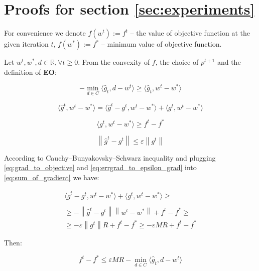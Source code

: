 \documentclass[runningheads, final]{llncs}
\newcommand{\norm}[1]{\left\lVert#1\right\rVert}
\newcommand{\vprod}[1]{\langle#1\rangle}
\newcommand{\errgrad}{\hat{g}}
\begin{document}
\clearpage
\section{Proofs for section \ref{sec:experiments}}

For convenience we denote $f(w^t) := f^t$ -- the value of objective
function at the given iteration $t$, $f(w^*) := f^*$ -- minimum value of
objective function.

Let $w^t, w^*, d \in \mathbb{R}, \forall t \geqslant 0$. From the convexity
of $f$, the choice of $p^{t+1}$ and the definition of \textbf{EO}:

\begin{equation}
    -\min_{d \in C}\vprod{\errgrad_t, d - w^t} \geqslant
    \vprod{\errgrad_t, w^t - w^*}
\end{equation}

\begin{equation}\label{eq:sum_of_gradient}
    \vprod{\errgrad^t, w^t - w^*} = \vprod{\errgrad^t - g^t, w^t - w^*} +
    \vprod{g^t, w^t - w^*}
\end{equation}

\begin{equation}\label{eq:grad_to_objective}
    \vprod{g^t, w^t - w^*} \geqslant f^t - f^*
\end{equation}

\begin{equation}\label{eq:errgrad_to_epsilon_grad}
    \norm{\errgrad^t - g^t} \leqslant \varepsilon \norm{g^t}
\end{equation}

According to Cauchy–Bunyakovsky–Schwarz inequality and plugging
\ref{eq:grad_to_objective} and \ref{eq:errgrad_to_epsilon_grad} into
\ref{eq:sum_of_gradient} we have:

\begin{equation}
    \begin{split}
        \vprod{\errgrad^t - g^t, w^t - w^*} +
        \vprod{g^t, w^t - w^*}\geqslant \\
        \\\geqslant- \norm{\errgrad^t - g^t} \norm{w^t - w^*}
        + f^t - f^* \geqslant           \\
        \geqslant - \varepsilon \norm{g^t} R
        + f^t - f^* \geqslant - \varepsilon M R + f^t - f^*
    \end{split}
\end{equation}

Then:

\begin{equation}
    f^t - f^* \leqslant \varepsilon M R -
    \min\limits_{d \in C}\vprod{\errgrad_t, d - w^t}
\end{equation}
\end{document}
